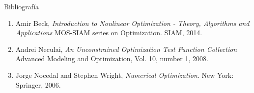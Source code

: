 \documentclass[fleqn]{beamer}\usepackage[]{graphicx}\usepackage[]{xcolor}
\begin{document}
\begin{frame}{Bibliografía}
\begin{enumerate}
    \item Amir Beck, \emph{Introduction to Nonlinear Optimization - Theory, Algorithms and Applications} MOS-SIAM series on Optimization. SIAM, 2014.\\
    \item Andrei Neculai, \emph{An Unconstrained Optimization Test Function Collection} Advanced Modeling and Optimization, Vol. 10, number 1, 2008.\\
    \item Jorge Nocedal and Stephen Wright,  \emph{Numerical Optimization}. New York: Springer, 2006.
\end{enumerate}
\end{frame}
\end{document}
